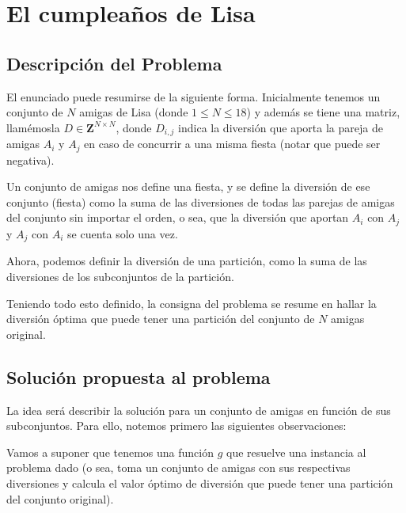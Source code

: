 \newpage{}
\section{El cumpleaños de Lisa}

\subsection{Descripción del Problema}

El enunciado puede resumirse de la siguiente forma. Inicialmente tenemos un conjunto de $N$ amigas de Lisa (donde $ 1 \leq N \leq 18$) y además se tiene una matriz, llamémosla $D \in \mathbf{Z}^{N \times N}$, donde $D_{i,j}$ indica la diversión que aporta la pareja de amigas $A_i$ y $A_j$ en caso de concurrir a una misma fiesta (notar que puede ser negativa).

Un conjunto de amigas nos define una fiesta, y se define la diversión de ese conjunto (fiesta) como la suma de las diversiones de todas las parejas de amigas del conjunto sin importar el orden, o sea, que la diversión que aportan $A_i$ con $A_j$ y $A_j$ con $A_i$ se cuenta solo una vez.

Ahora, podemos definir la diversión de una partición, como la suma de las diversiones de los subconjuntos de la partición.

Teniendo todo esto definido, la consigna del problema se resume en hallar la diversión óptima que puede tener una partición del conjunto de $N$ amigas original. 

\subsection{Solución propuesta al problema}

La idea será describir la solución para un conjunto de amigas en función de sus subconjuntos. Para ello, notemos primero las siguientes observaciones:

Vamos a suponer que tenemos una función $g$ que resuelve una instancia al problema dado (o sea, toma un conjunto de amigas con sus respectivas diversiones y calcula el valor óptimo de diversión que puede tener una partición del conjunto original).

